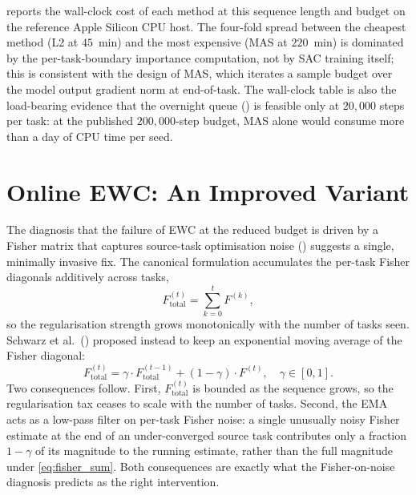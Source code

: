  reports the wall-clock cost of each method
at this sequence length and budget on the reference Apple
Silicon CPU host. The four-fold spread between the cheapest
method (L2 at $45$~min) and the most expensive (MAS at
$220$~min) is dominated by the per-task-boundary importance
computation, not by SAC training itself; this is consistent
with the design of MAS, which iterates a sample budget over
the model output gradient norm at end-of-task. The wall-clock
table is also the load-bearing evidence that the overnight
queue () is feasible only at $20{,}000$ steps
per task: at the published $200{,}000$-step budget, MAS alone
would consume more than a day of CPU time per seed.

\begin{table}[t]
    \centering
    \caption{Wall-clock time per CO4 run at $20{,}000$ steps
        per task, on the reference Apple Silicon CPU host.
        Single-seed values report the run; multi-seed values
        report mean $\pm$ standard deviation.}
    \label{tab:walltime}
\end{table}

\section{Online EWC: An Improved Variant}
\label{sec:ewc_online_impl}

The diagnosis that the failure of EWC at the reduced budget is
driven by a Fisher matrix that captures source-task optimisation
noise () suggests a single, minimally
invasive fix. The canonical formulation
\citep{kirkpatrick2017ewc} accumulates the per-task Fisher
diagonals additively across tasks,
\begin{equation}
    F^{(t)}_{\mathrm{total}} = \sum_{k=0}^{t} F^{(k)},
    \label{eq:fisher_sum}
\end{equation}
so the regularisation strength grows monotonically with the
number of tasks seen. Schwarz et al.\
(\citeyear{schwarz2018progress}) proposed instead to keep an
exponential moving average of the Fisher diagonal:
\begin{equation}
    F^{(t)}_{\mathrm{total}}
    = \gamma \cdot F^{(t-1)}_{\mathrm{total}}
      + (1 - \gamma) \cdot F^{(t)}, \quad \gamma \in [0, 1].
    \label{eq:fisher_ema}
\end{equation}
Two consequences follow. First, $F^{(t)}_{\mathrm{total}}$ is
bounded as the sequence grows, so the regularisation tax
ceases to scale with the number of tasks. Second, the EMA acts
as a low-pass filter on per-task Fisher noise: a single
unusually noisy Fisher estimate at the end of an
under-converged source task contributes only a fraction
$1 - \gamma$ of its magnitude to the running estimate, rather
than the full magnitude under \cref{eq:fisher_sum}. Both
consequences are exactly what the Fisher-on-noise diagnosis
predicts as the right intervention.

